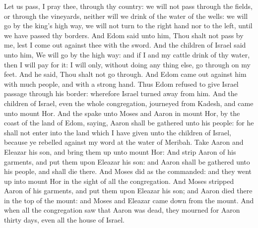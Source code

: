 \begin{biblechapter}
\verse Let us pass, I pray thee, through thy country: we will not pass through the fields, or through the vineyards, neither will we drink of the water of the wells: we will go by the king's high way, we will not turn to the right hand nor to the left, until we have passed thy borders.
\verse And Edom said unto him, Thou shalt not pass by me, lest I come out against thee with the sword.
\verse And the children of Israel said unto him, We will go by the high way: and if I and my cattle drink of thy water, then I will pay for it: I will only, without doing any thing else, go through on my feet.
\verse And he said, Thou shalt not go through. And Edom came out against him with much people, and with a strong hand.
\verse Thus Edom refused to give Israel passage through his border: wherefore Israel turned away from him.
 And the children of Israel, even the whole congregation, journeyed from Kadesh, and came unto mount Hor.
\verse And the \LORD spake unto Moses and Aaron in mount Hor, by the coast of the land of Edom, saying,
\verse Aaron shall be gathered unto his people: for he shall not enter into the land which I have given unto the children of Israel, because ye rebelled against my word at the water of Meribah.
\verse Take Aaron and Eleazar his son, and bring them up unto mount Hor:
\verse And strip Aaron of his garments, and put them upon Eleazar his son: and Aaron shall be gathered unto his people, and shall die there.
\verse And Moses did as the \LORD commanded: and they went up into mount Hor in the sight of all the congregation.
\verse And Moses stripped Aaron of his garments, and put them upon Eleazar his son; and Aaron died there in the top of the mount: and Moses and Eleazar came down from the mount.
\verse And when all the congregation saw that Aaron was dead, they mourned for Aaron thirty days, even all the house of Israel.
\end{biblechapter}

